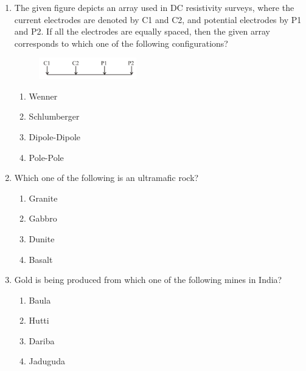\documentclass[journal,12pt,onecolumn]{IEEEtran}
\begin{document}
\begin{enumerate}
\item The given figure depicts an array used in DC resistivity surveys, where the current electrodes are denoted by C1 and C2, and potential electrodes by P1 and P2. If all the electrodes are equally spaced, then the given array corresponds to which one of the following configurations?
\begin{figure}[h!]
    \centering
    \includegraphics[width=0.4\textwidth]{figs/fig3.png}
    \caption{}
    \label{fig:q18}
\end{figure}



\hfill{}

\begin{multicols}{2}
\begin{enumerate}
    \item Wenner
    \item Schlumberger
    \item Dipole-Dipole
    \item Pole-Pole
\end{enumerate}
\end{multicols}

\item Which one of the following is an ultramafic rock?

\hfill{}

\begin{multicols}{4}
\begin{enumerate}
    \item Granite
    \item Gabbro
    \item Dunite
    \item Basalt
\end{enumerate}
\end{multicols}


\newpage

\item Gold is being produced from which one of the following mines in India?

\hfill{}

\begin{multicols}{2}
\begin{enumerate}
    \item Baula
    \item Hutti
    \item Dariba
    \item Jaduguda
\end{enumerate}
\end{multicols}


\end{enumerate}
\end{document}
